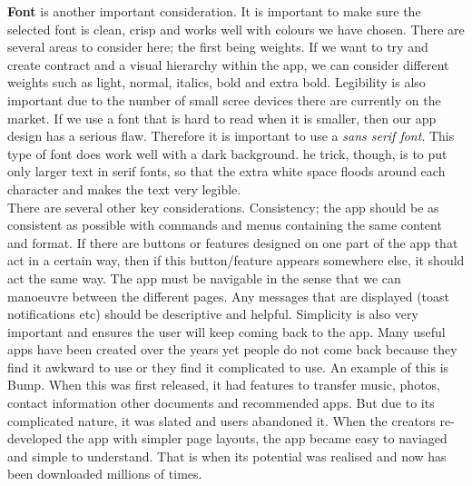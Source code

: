 \textbf{Font} is another important consideration.  It is important to make sure the selected font is clean, crisp and works well with colours we have chosen.  There are several areas to consider here; the first being weights.  If we want to try and create contract and a visual hierarchy within the app, we can consider different weights such as light, normal, italics, bold and extra bold.  Legibility is also important due to the number of small scree devices there are currently on the market.  If we use a font that is hard to read when it is smaller, then our app design has a serious flaw.  Therefore it is important to use a \emph{sans serif font}.  This type of font does work well with a dark background.  
he trick, though, is to put only larger text in serif fonts, so that the extra white space floods around each character and makes the text very legible.  \\
There are several other key considerations.  Consistency; the app should be as consistent as possible with commands and menus containing the same content and format.  If there are buttons or features designed on one part of the app that act in a certain way, then if this button/feature appears somewhere else, it should act the same way.  The app must be navigable in the sense that we can manoeuvre between the different pages.  Any messages that are displayed (toast notifications etc) should be descriptive and helpful.  Simplicity is also very important and ensures the user will keep coming back to the app.  Many useful apps have been created over the years yet people do not come back because they find it awkward to use or they find it complicated to use.  An example of this is Bump.  When this was first released, it had features to transfer music, photos, contact information other documents and recommended apps.  But due to its complicated nature, it was slated and users abandoned it.  When the creators re-developed the app with simpler page layouts, the app became easy to naviaged and simple to understand.  That is when its potential was realised and now has been downloaded millions of times.  

